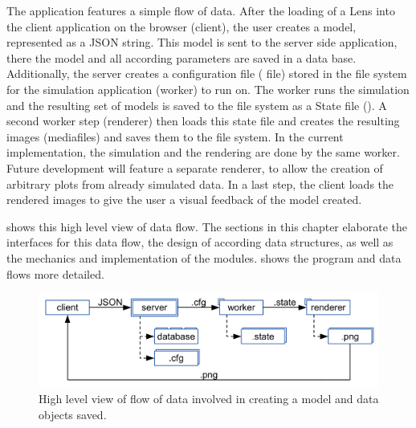 The application features a simple flow of data.
After the loading of a Lens into the client application on the browser (client), the user creates a model, represented as a JSON string.
This model is sent to the server side application, there the model and all according parameters are saved in a data base.
Additionally, the server creates a configuration file ( file) stored in the file system for the simulation application (worker) to run on.
The worker runs the simulation and the resulting set of models is saved to the file system as a State file ().
A second worker step (renderer) then loads this state file and creates the resulting images (mediafiles) and saves them to the file system.
In the current implementation, the simulation and the rendering are done by the same worker.
Future development will feature a separate renderer, to allow the creation of arbitrary plots from already simulated data.
In a last step, the client loads the rendered images to give the user a visual feedback of the model created.

 shows this high level view of data flow.
The sections in this chapter elaborate the interfaces for this data flow, the design of according data structures, as well as the mechanics and implementation of the modules.
 shows the program and data flows more detailed.

\begin{figure}[htbp]
  \centering
    \includegraphics[width=\figwidth]{fig/dataflow.pdf}
  \caption{High level view of flow of data involved in creating a model and data objects saved.}
  \label{fig:dataflow}
\end{figure}



